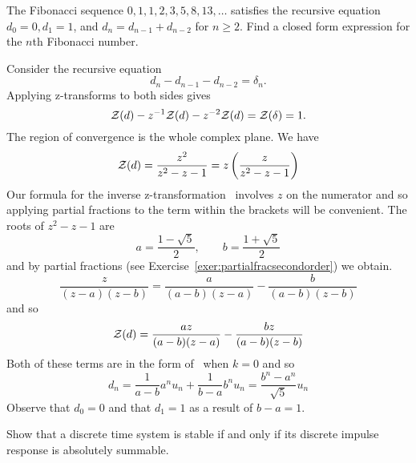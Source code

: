 \begin{excersizelist}
\item \label{exer:fibonacci} The Fibonacci sequence $0,1,1,2,3,5,8,13,\dots$ satisfies the recursive equation $d_0 = 0, d_1 = 1$, and $d_n = d_{n-1} + d_{n-2}$ for $n \geq 2$.  Find a closed form expression for the $n$th Fibonacci number.
\begin{solution}
Consider the recursive equation
\[
d_n - d_{n-1} - d_{n-2} = \delta_{n}.
\]
Applying z-transforms to both sides gives
\[
{\mathcal Z}(d) - z^{-1} {\mathcal Z}(d) - z^{-2} {\mathcal Z}(d) = {\mathcal Z}(\delta) = 1.
\]
The region of convergence is the whole complex plane.  We have
\[
{\mathcal Z}(d) = \frac{z^2}{z^2 - z - 1} = z \left( \frac{z}{z^2 - z - 1} \right)
\]
Our formula for the inverse z-transformation~ involves $z$ on the numerator and so applying partial fractions to the term within the brackets will be convenient.  The roots of $z^2 - z - 1$ are
\[
a = \frac{1-\sqrt{5}}{2}, \qquad b = \frac{1+\sqrt{5}}{2}
\]
and by partial fractions (see Exercise~\ref{exer:partialfracsecondorder}) we obtain.
\[
\frac{z}{(z-a)(z-b)} = \frac{a}{(a-b) (z-a)}-\frac{b}{(a-b) (z-b)}
\]
and so
\[
{\mathcal Z}(d) = \frac{az}{(a-b) (z-a)}-\frac{bz}{(a-b) (z-b)}
\]
Both of these terms are in the form of~ when $k=0$ and so
\[
d_n = \frac{1}{a-b} a^n u_n + \frac{1}{b-a} b^n u_n = \frac{b^n - a^n}{\sqrt{5}} u_n
\]
Observe that $d_0 = 0$ and that $d_1 = 1$ as a result of $b - a = 1$.
\end{solution}


\begin{hardexercise}

\item \label{excer:stableimpulserespdiscretetime} Show that a discrete time system is stable if and only if its discrete impulse response is absolutely summable. 


\end{hardexercise}
\end{excersizelist}
